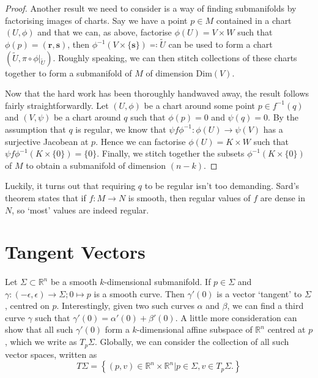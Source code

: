 \documentclass[fleqn, 11pt]{report}
\begin{document}
\begin{proof}
	Another result we need to consider is a way of finding submanifolds by factorising images of charts. Say we have a point $ p \in M $ contained in a chart $ (U, \phi) $ and that we can, as above, factorise $ \phi(U) = V \times W $ such that $ \phi(p) = (\mathbf{r},\mathbf{s}) $, then $ \phi^{-1}(V \times \{\mathbf{s}\}) \eqqcolon \tilde{U} $ can be used to form a chart $ \left( \tilde{U}, \pi \circ \phi|_{\tilde{U}} \right) $. Roughly speaking, we can then stitch collections of these charts together to form a submanifold of $ M $ of dimension $ \mathrm{Dim} (V) $.

	Now that the hard work has been thoroughly handwaved away, the result follows fairly straightforwardly. Let $ (U,\phi) $ be a chart around some point $ p \in f^{-1}(q) $ and $ (V, \psi) $ be a chart around $ q $ such that $ \phi(p) = 0 $ and $ \psi(q) = 0 $. By the assumption that $ q $ is regular, we know that $ \psi f \phi^{-1}: \phi(U) \to \psi(V) $ has a surjective Jacobean at $ p $. Hence we can factorise $ \phi(U) = K \times W $ such that $ \psi f \phi^{-1} \left( K \times \{0\} \right) = \{ 0 \} $. Finally, we stitch together the subsets $ \phi^{-1} \left( K \times \{0\} \right) $ of $ M $ to obtain a submanifold of dimension $ (n-k) $.

\end{proof}

\begin{remark}
	Luckily, it turns out that requiring $ q $ to be regular isn't too demanding. Sard's theorem states that if $ f: M \to N $ is smooth, then regular values of $ f $ are dense in $ N $, so `most' values are indeed regular.
\end{remark}

\section{Tangent Vectors}

\paragraph{}
Let $ \Sigma \subset \mathbb{R}^n $ be a smooth $ k $-dimensional submanifold. If $ p \in \Sigma $ and $ \gamma: (-\epsilon, \epsilon) \to \Sigma; 0 \mapsto p $ is a smooth curve. Then $ \gamma'(0) $ is a vector `tangent' to $ \Sigma $, centred on $ p $. Interestingly, given two such curves $ \alpha $ and $ \beta $, we can find a third curve $ \gamma $ such that $ \gamma'(0) = \alpha'(0) + \beta'(0) $. A little more consideration can show that all such $ \gamma'(0) $ form a $ k $-dimensional affine subspace of $ \mathbb{R}^n $ centred at $ p $, which we write as $ T_p\Sigma $. Globally, we can consider the collection of all such vector spaces, written as
	\begin{equation}
		T\Sigma = \left\{ (p,v) \in \mathbb{R}^n \times \mathbb{R}^n | p \in \Sigma, v \in T_p\Sigma. \right\}
	\end{equation}
\end{document}
